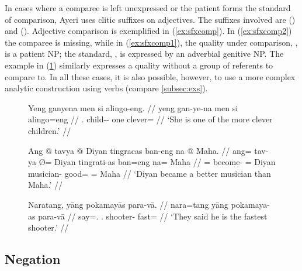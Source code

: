 In cases where a comparee is left unexpressed or the patient forms the standard
of comparison, Ayeri uses clitic suffixes on adjectives. The suffixes involved
are  (\Comp{}) and  (\Supl{}). Adjective
comparison is exemplified in (\ref{ex:sfxcomp}). In (\ref{ex:sfxcomp2}) the
comparee is missing, while in (\ref{ex:sfxcomp1}), the quality under
comparison, ,
is a patient NP; the standard, , is expressed by an adverbial
genitive NP. The example in (\ref{ex:sfxsupl}) similarly expresses a quality
without a group of referents to compare to. In all these cases, it is also
possible, however, to use a more complex analytic construction using verbs
(compare \autoref{subsec:exs}).

\begin{figure}[h]
\pex\label{ex:sfxcomp}
\a\label{ex:sfxcomp2}\begingl
	\gla Yeng ganyena men si alingo-eng. //
	\glb yeng gan-ye-na men si alingo=eng //
	\glc \TsgF{}.\Aarg{} child-\Pl{}-\Gen{} one \Rel{} clever=\Comp{} //
	\glft `She is one of the more clever children.' //
\endgl

\a\label{ex:sfxcomp1}\begingl
	\gla Ang @ tavya {} @ Diyan tingracas ban-eng na @ Maha. //
	\glb ang= tav-ya Ø= Diyan tingrati-as ban=eng na= Maha //
	\glc \AgtT{}= become-\TsgM{} \Top{}= Diyan musician-\Parg{} good=\Comp{} 
		\Gen{}= Maha //
	\glft `Diyan became a better musician than Maha.' //
\endgl


\a\label{ex:sfxsupl}\begingl
	\gla Naratang, yāng pokamayās para-vā. //
	\glb nara=tang yāng pokamaya-as para-vā //
	\glc say=\TplM{}.\Aarg{} \TsgM.\Aarg{} shooter-\Parg{} fast=\Supl{} //
	\glft `They said he is the fastest shooter.' //
\endgl
\xe
\end{figure}


\subsection{Negation}
\label{subsec:adjneg}

